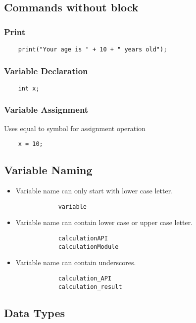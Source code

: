 \documentclass[12pt,letterpaper]{article}
\begin{document}
\subsection{Commands without block}
\subsubsection{Print}
\begin{verbatim}
    print("Your age is " + 10 + " years old");
\end{verbatim}

\subsubsection{Variable Declaration}
\begin{verbatim}
    int x;
\end{verbatim}

\subsubsection{Variable Assignment}
Uses equal to symbol for assignment operation
\begin{verbatim}
    x = 10;
\end{verbatim}

\subsection{Variable Naming}
\begin{itemize}
    \item Variable name can only start with lower case letter.
        \begin{verbatim}
            variable
        \end{verbatim}
    \item Variable name can contain lower case or upper case letter.
        \begin{verbatim}
            calculationAPI
            calculationModule
        \end{verbatim}
    \item Variable name can contain underscores.
        \begin{verbatim}
            calculation_API
            calculation_result
        \end{verbatim}
\end{itemize}

\subsection{Data Types}
\end{document}
